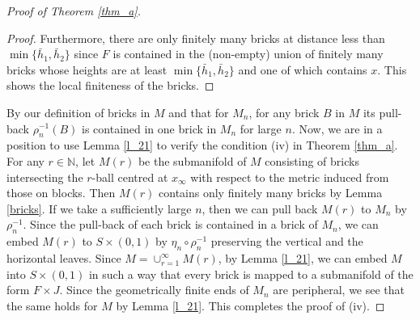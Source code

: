 \documentclass{amsart}
\theoremstyle{definition}
\numberwithin{figure}{section}
\numberwithin{equation}{section}
\newcommand{\blackboard}[1]{\ensuremath{\mathbb{#1}}}
\newcommand{\naturals}{\blackboard{N}}
\def\cv{\mathcal{V}}
\begin{document}
\begin{proof}[Proof of Theorem \ref{thm_a}]
\begin{proof}
Furthermore, there are only finitely many bricks at distance less than $\min\{\bar h_1, \bar h_2\}$ since $F$ is contained in  the (non-empty) union of finitely many  bricks whose heights are at least $\min\{\bar h_1, \bar h_2\}$ and one of which contains $x$.
This shows the local finiteness of the bricks.
\end{proof}


By our definition of bricks in $M$ and that for $M_n$, for any brick $B$ in $M$ its pull-back $\rho_n^{-1}(B)$ is contained in one brick in $M_n$ for large $n$.
Now, we are in a position to use Lemma \ref{l_21} to verify the condition (iv) in Theorem \ref{thm_a}.
For any $r \in \naturals$, let $M(r)$ be the submanifold of $M$ consisting of bricks intersecting the $r$-ball centred at $x_\infty$ with respect to the metric induced from those on blocks.
Then $M(r)$ contains only finitely many bricks by Lemma \ref{bricks}.
If we take a sufficiently large $n$, then we can pull back $M(r)$ to $M_n$ by $\rho_n^{-1}$.
Since the pull-back of each brick is contained in a brick of $M_n$, we can embed $M(r)$ to $S \times (0,1)$ by $\eta_n \circ \rho_n^{-1}$ preserving the vertical and the horizontal leaves.
Since $M= \cup_{r=1}^\infty M(r)$, by Lemma \ref{l_21}, we can embed $M$ into $S \times (0,1)$ in such a way that every brick is mapped to a submanifold of the form $F \times J$.
Since the geometrically finite ends of $M_n$ are peripheral, we see that the same holds for $M$ by Lemma \ref{l_21}.
This completes the proof of (iv).



\end{proof}
\end{document}
